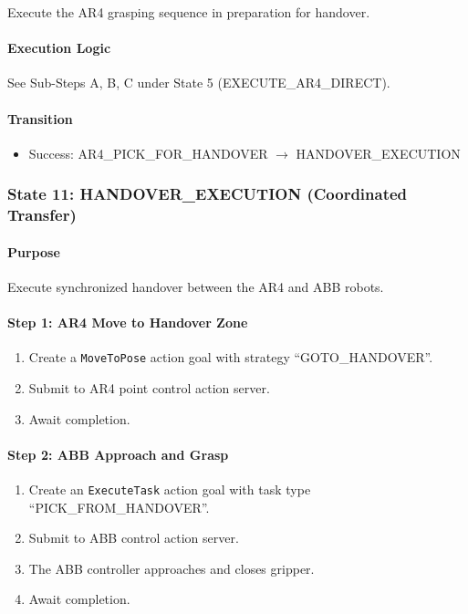 Execute the AR4 grasping sequence in preparation for handover.

\paragraph{Execution Logic}

See Sub-Steps A, B, C under State 5 (EXECUTE\_AR4\_DIRECT).

\paragraph{Transition}

\begin{itemize}
    \item Success: AR4\_PICK\_FOR\_HANDOVER $\rightarrow$ HANDOVER\_EXECUTION
\end{itemize}

\subsubsection{State 11: HANDOVER\_EXECUTION (Coordinated Transfer)}
\label{state:handoverexecution}

\paragraph{Purpose}

Execute synchronized handover between the AR4 and ABB robots.

\paragraph{Step 1: AR4 Move to Handover Zone}

\begin{enumerate}
    \item Create a \texttt{MoveToPose} action goal with strategy ``GOTO\_HANDOVER''.
    \item Submit to AR4 point control action server.
    \item Await completion.
\end{enumerate}

\paragraph{Step 2: ABB Approach and Grasp}

\begin{enumerate}
    \item Create an \texttt{ExecuteTask} action goal with task type ``PICK\_FROM\_HANDOVER''.
    \item Submit to ABB control action server.
    \item The ABB controller approaches and closes gripper.
    \item Await completion.
\end{enumerate}

